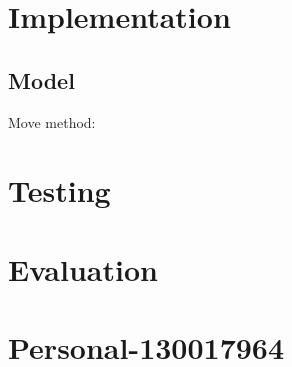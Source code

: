 \documentclass{article}
\begin{document}
\section{Implementation}
\subsection{Model}
Move method:

\section{Testing}
\section{Evaluation}
\section{Personal-130017964}
\end{document}

